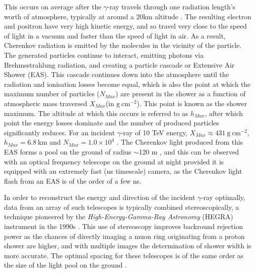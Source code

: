 This occurs on average after the $\gamma$-ray travels through one radiation length's worth of atmosphere, typically at around a 20km altitude \cite{weekesgamma}. The resulting electron and positron have very high kinetic energy, and so travel very close to the speed of light in a vacuum and faster than the speed of light in air. As a result, Cherenkov radiation is emitted by the molecules in the vicinity of the particle.
The generated particles continue to interact, emitting photons via Brehmsstrahlung radiation, and creating a particle cascade or Extensive Air Shower (EAS). This cascade continues down into the atmosphere until the radiation and ionisation losses become equal, which is also the point at which the maximum number of particles ($N_{Max}$) are present in the shower as a function of atmospheric mass traversed $X_{Max}$(in $\mathrm{g\ cm^{-2}}$). This point is known as the shower maximum. The altitude at which this occurs is referred to as $h_{Max}$, after which point the energy losses dominate and the number of produced particles significantly reduces. For an incident $\gamma$-ray of 10 TeV energy, $X_{Max}\approx 431 \mathrm{\ g\ cm^{-2}}$, $h_{Max}=6.8\ \mathrm{km}$ and $N_{Max}=1.0 \times 10^4$ \cite{weekesgamma}.  The Cherenkov light produced from this EAS forms a pool on the ground of radius $\sim$120 m \cite{weekesgamma}, and this can be observed with an optical frequency telescope on the ground at night provided it is equipped with an extremely fast (ns timescale) camera, as the Cherenkov light flash from an EAS is of the order of a few ns. 

In order to reconstruct the energy and direction of the incident $\gamma$-ray optimally, data from an array of such telescopes is typically combined stereoscopically, a technique pioneered by the \textit{High-Energy-Gamma-Ray Astronomy} (HEGRA) instrument in the 1990s \cite{HEGRA}. This use of stereoscopy improves backround rejection power as the chances of directly imaging a muon ring originating from a proton shower are higher, and with multiple images the determination of shower width is more accurate.  The optimal spacing for these telescopes is of the same order as the size of the light pool on the ground \cite{weekesgamma}.

